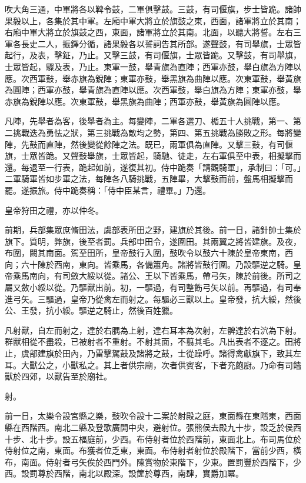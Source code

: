 \begin{pinyinscope}
 吹大角三通，中軍將各以鞞令鼓，二軍俱擊鼓。三鼓，有司偃旗，步士皆跪。諸帥果毅以上，各集於其中軍。左廂中軍大將立於旗鼓之東，西面，諸軍將立於其南；右廂中軍大將立於旗鼓之西，東面，諸軍將立於其南。北面，以聽大將誓。左右三軍各長史二人，振鐸分循，諸果毅各以誓詞告其所部。遂聲鼓，有司舉旗，士眾皆起行，及表，擊鉦，乃止。又擊三鼓，有司偃旗，士眾皆跪。又擊鼓，有司舉旗，士眾皆起，驟及表，乃止。東軍一鼓，舉青旗為直陣；西軍亦鼓，舉白旗為方陣以應。次西軍鼓，舉赤旗為銳陣；東軍亦鼓，舉黑旗為曲陣以應。次東軍鼓，舉黃旗為圓陣；西軍亦鼓，舉青旗為直陣以應。次西軍鼓，舉白旗為方陣；東軍亦鼓，舉赤旗為銳陣以應。次東軍鼓，舉黑旗為曲陣；西軍亦鼓，舉黃旗為圓陣以應。



 凡陣，先舉者為客，後舉者為主。每變陣，二軍各選刀、楯五十人挑戰，第一、第二挑戰迭為勇怯之狀，第三挑戰為敵均之勢，第四、第五挑戰為勝敗之形。每將變陣，先鼓而直陣，然後變從餘陣之法。既已，兩軍俱為直陣。又擊三鼓，有司偃旗，士眾皆跪。又聲鼓舉旗，士眾皆起，騎馳、徒走，左右軍俱至中表，相擬擊而還。每退至一行表，跪起如前，遂復其初。侍中跪奏「請觀騎軍」，承制曰：「可。」二軍騎軍皆如步軍之法，每陣各八騎挑戰，五陣畢，大擊鼓而前，盤馬相擬擊而罷。遂振旅。侍中跪奏稱：「侍中臣某言，禮畢。」乃還。



 皇帝狩田之禮，亦以仲冬。



 前期，兵部集眾庶脩田法，虞部表所田之野，建旗於其後。前一日，諸針帥士集於旗下。質明，弊旗，後至者罰。兵部申田令，遂圍田。其兩翼之將皆建旗。及夜，布圍，闕其南面。駕至田所，皇帝鼓行入圍，鼓吹令以鼓六十陳於皇帝東南，西向；六十陳於西南，東向。皆乘馬，各備簫角。諸將皆鼓行圍。乃設驅逆之騎。皇帝乘馬南向，有司斂大綏以從。諸公、王以下皆乘馬，帶弓矢，陳於前後。所司之屬又斂小綏以從。乃驅獸出前。初，一驅過，有司整飭弓矢以前。再驅過，有司奉進弓矢。三驅過，皇帝乃從禽左而射之。每驅必三獸以上。皇帝發，抗大綏，然後公、王發，抗小綏。驅逆之騎止，然後百姓獵。



 凡射獸，自左而射之，達於右腢為上射，達右耳本為次射，左髀達於右泬為下射。群獸相從不盡殺，已被射者不重射。不射其面，不翦其毛。凡出表者不逐之。田將止，虞部建旗於田內，乃雷擊駕鼓及諸將之鼓，士從躁呼。諸得禽獻旗下，致其左耳。大獸公之，小獸私之。其上者供宗廟，次者供賓客，下者充皰廚。乃命有司饁獸於四郊，以獸告至於廟社。



 射。



 前一日，太樂令設宮縣之樂，鼓吹令設十二案於射殿之庭，東面縣在東階東，西面縣在西階西。南北二縣及登歌廣開中央，避射位。張熊侯去殿九十步，設乏於侯西十步、北十步。設五楅庭前，少西。布侍射者位於西階前，東面北上。布司馬位於侍射位之南，東面。布獲者位乏東，東面。布侍射者射位於殿階下，當前少西，橫布，南面。侍射者弓矢俟於西門外。陳賞物於東階下，少東。置罰豐於西階下，少西。設罰尊於西階，南北以殿深。設篚於尊西，南肆，實爵加冪。




\end{pinyinscope}

